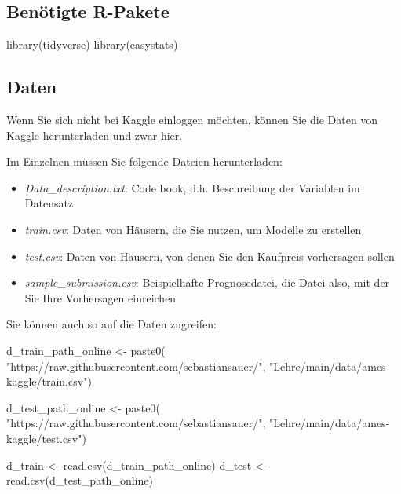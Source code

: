 \documentclass[
  a4paper,
]{scrbook}
\newenvironment{Shaded}{\begin{snugshade}}{\end{snugshade}}
\newcommand{\FunctionTok}[1]{\textcolor[rgb]{0.28,0.35,0.67}{#1}}
\newcommand{\NormalTok}[1]{\textcolor[rgb]{0.00,0.23,0.31}{#1}}
\newcommand{\OtherTok}[1]{\textcolor[rgb]{0.00,0.23,0.31}{#1}}
\newcommand{\StringTok}[1]{\textcolor[rgb]{0.13,0.47,0.30}{#1}}
\providecommand{\tightlist}{%
  \setlength{\itemsep}{0pt}\setlength{\parskip}{0pt}}\usepackage{longtable,booktabs,array}
\theoremstyle{definition}
\theoremstyle{definition}
\theoremstyle{definition}
\theoremstyle{remark}
\begin{document}
\subsection{Benötigte R-Pakete}\label{benuxf6tigte-r-pakete-6}

\begin{Shaded}
\begin{Highlighting}[]
\FunctionTok{library}\NormalTok{(tidyverse)}
\FunctionTok{library}\NormalTok{(easystats)}
\end{Highlighting}
\end{Shaded}

\subsection{Daten}\label{daten}

Wenn Sie sich nicht bei Kaggle einloggen möchten, können Sie die Daten
von Kaggle herunterladen und zwar
\href{https://www.kaggle.com/competitions/house-prices-advanced-regression-techniques/data}{hier}.

Im Einzelnen müssen Sie folgende Dateien herunterladen:

\begin{itemize}
\tightlist
\item
  \emph{Data\_description.txt}: Code book, d.h. Beschreibung der
  Variablen im Datensatz
\item
  \emph{train.csv}: Daten von Häusern, die Sie nutzen, um Modelle zu
  erstellen
\item
  \emph{test.csv}: Daten von Häusern, von denen Sie den Kaufpreis
  vorhersagen sollen
\item
  \emph{sample\_submission.csv}: Beispielhafte Prognosedatei, die Datei
  also, mit der Sie Ihre Vorhersagen einreichen
\end{itemize}

Sie können auch so auf die Daten zugreifen:

\begin{Shaded}
\begin{Highlighting}[]
\NormalTok{d\_train\_path\_online }\OtherTok{\textless{}{-}} \FunctionTok{paste0}\NormalTok{(}
    \StringTok{"https://raw.githubusercontent.com/sebastiansauer/"}\NormalTok{,}
    \StringTok{"Lehre/main/data/ames{-}kaggle/train.csv"}\NormalTok{)}

\NormalTok{d\_test\_path\_online }\OtherTok{\textless{}{-}} \FunctionTok{paste0}\NormalTok{(}
  \StringTok{"https://raw.githubusercontent.com/sebastiansauer/"}\NormalTok{,}
  \StringTok{"Lehre/main/data/ames{-}kaggle/test.csv"}\NormalTok{)}

\NormalTok{d\_train }\OtherTok{\textless{}{-}} \FunctionTok{read.csv}\NormalTok{(d\_train\_path\_online)}
\NormalTok{d\_test }\OtherTok{\textless{}{-}} \FunctionTok{read.csv}\NormalTok{(d\_test\_path\_online)}
\end{Highlighting}
\end{Shaded}
\end{document}
